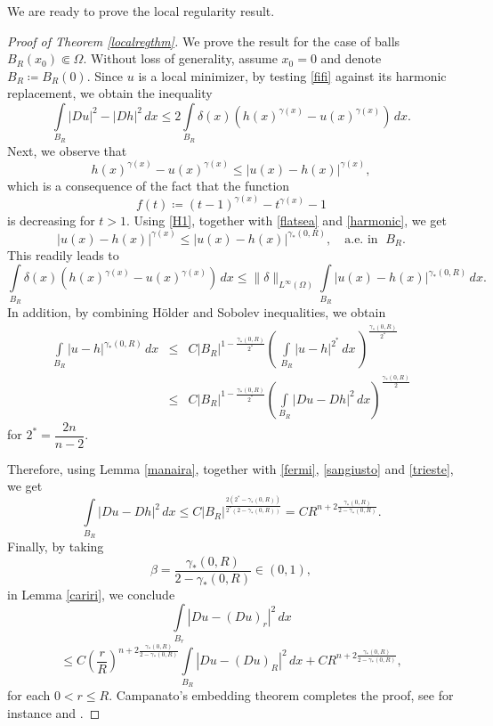 \documentclass[reqno,11pt]{amsart}
\newcommand{\1}{\mathds{1}}
\numberwithin{equation}{section}
\begin{document}
We are ready to prove the local regularity result.

\begin{proof}[Proof of Theorem \ref{localregthm}] We prove the result for the case of balls $B_R(x_0) \Subset \Omega$.
Without loss of generality, assume $x_0=0$ and denote $B_R\coloneqq B_R(0)$. 
Since $u$ is a local minimizer, by testing \eqref{fifi} against its harmonic replacement, we obtain the inequality
\begin{equation} \label{fermi}
\displaystyle\int\limits_{B_R}|Du|^2-|Dh|^2 \, dx  \leq  2 \displaystyle\int\limits_{B_R} \delta(x)\left( h(x)^{\gamma(x)}-u(x)^{\gamma(x)} \right) \, dx.
\end{equation}
Next, we observe that
$$
	h(x)^{\gamma(x)}-u(x)^{\gamma(x)} \le |u(x)-h(x)|^{\gamma(x)},
$$
which is a consequence of the fact that the function 
$$
	f(t) \coloneqq (t-1)^{\gamma(x)} - t^{\gamma(x)} -1
$$ 
is decreasing for $t>1$. Using \eqref{H1}, together with \eqref{flatsea} and \eqref{harmonic}, we get
\begin{equation}\label{sangiusto}
|u(x)-h(x)|^{\gamma(x)} \leq |u(x)-h(x)|^{\gamma_\ast (0,R)}, \quad \text{a.e. in } \; B_R.
\end{equation}
This readily leads to 
$$\displaystyle\int\limits_{B_R} \delta(x)\left( h(x)^{\gamma(x)}-u(x)^{\gamma(x)} \right) \, dx \leq \|\delta\|_{L^\infty(\Omega)} \int\limits_{B_R} |u(x)-h(x)|^{\gamma_\ast (0,R)}\, dx.$$	
In addition, by combining H\"older  and Sobolev inequalities, we obtain
\begin{eqnarray}
    \int\limits_{B_R} |u-h|^{\gamma_\ast (0,R)}\, dx & \leq & C |B_R|^{1-\frac{\gamma_\ast (0,R)}{2^\ast}}\left( \,\int\limits_{B_R} |u-h|^{2^\ast}\, dx \, \right)^{\frac{\gamma_\ast (0,R)}{2^\ast}} \nonumber \\
& \leq & C |B_R|^{1-\frac{\gamma_\ast (0,R)}{2^\ast}}\left( \displaystyle \int\limits_{B_R} |Du-Dh|^{2}\, dx \right)^{\frac{\gamma_\ast (0,R)}{2}} \label{trieste}
\end{eqnarray}
for $2^\ast=\dfrac{2n}{n-2}$. 

Therefore, using Lemma \ref{manaira}, together with \eqref{fermi}, \eqref{sangiusto} and \eqref{trieste}, we get
\begin{equation}\label{Cariri7}
\int\limits_{B_R}|Du-Dh|^2 \, dx \leq C |B_R|^{\frac{2(2^\ast-\gamma_\ast (0,R))}{2^\ast(2-\gamma_\ast (0,R))}}=CR^{n+2\frac{\gamma_\ast (0,R)}{2-\gamma_\ast (0,R)}}.
\end{equation}
Finally, by taking 
$$
\beta=\frac{\gamma_\ast (0,R)}{2-\gamma_\ast (0,R)} \in (0,1),
$$
in Lemma \ref{cariri}, we conclude 
$$\int\limits_{B_r}|Du-(Du)_r|^2 \, dx $$
$$\leq C\left( \frac{r}{R}\right)^{n+2\frac{\gamma_\ast (0,R)}{2-\gamma_\ast (0,R)}} \int\limits_{B_R}|Du-(Du)_R|^2 \, dx + CR^{n+2\frac{\gamma_\ast (0,R)}{2-\gamma_\ast (0,R)}},
$$
for each $0<r \leq R$. Campanato's embedding theorem completes the proof, see for instance \cite[Theorem 2.9]{EG} and \cite[Theorem 3.1 and Lemma 3.4]{QF}.
\end{proof}
\end{document}
